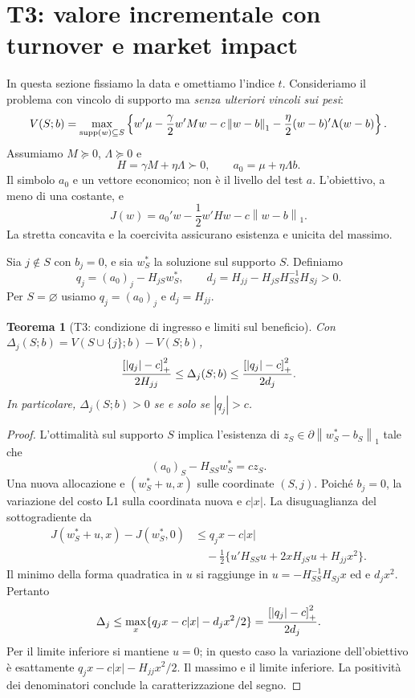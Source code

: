 \documentclass[11pt,a4paper]{article}
\newtheorem{theorem}{Teorema}[section]
\theoremstyle{definition}\newtheorem{definition}[theorem]{Definizione}
\theoremstyle{remark}\newtheorem{remark}[theorem]{Osservazione}
\newcommand{\norm}[1]{\left\lVert#1\right\rVert}\newcommand{\abs}[1]{\left|#1\right|}
\begin{document}
\section{T3: valore incrementale con turnover e market impact}
\label{sec:T3}
In questa sezione fissiamo la data e omettiamo l'indice $t$. Consideriamo il problema con vincolo di supporto ma \emph{senza ulteriori vincoli sui pesi}:
\begin{equation}
 V(S;b)=\max_{\supp(w)\subseteq S}\left\{w'\mu-\frac\gamma2w'Mw
 -c\norm{w-b}_1-\frac\eta2(w-b)'\Lambda(w-b)\right\}.
\end{equation}
Assumiamo $M\succeq0$, $\Lambda\succeq0$ e
\begin{equation}
 H=\gamma M+\eta\Lambda\succ0,\qquad a_0=\mu+\eta\Lambda b.
\end{equation}
Il simbolo $a_0$ e un vettore economico; non è il livello del test $a$. L'obiettivo, a meno di una costante, e
\begin{equation}
 J(w)=a_0'w-\frac12w'Hw-c\norm{w-b}_1.
\end{equation}
La stretta concavita e la coercivita assicurano esistenza e unicita del massimo.

Sia $j\notin S$ con $b_j=0$, e sia $w_S^*$ la soluzione sul supporto $S$. Definiamo
\begin{equation}
 q_j=(a_0)_j-H_{jS}w_S^*,\qquad
 d_j=H_{jj}-H_{jS}H_{SS}^{-1}H_{Sj}>0.
\end{equation}
Per $S=\varnothing$ usiamo $q_j=(a_0)_j$ e $d_j=H_{jj}$.

\begin{theorem}[T3: condizione di ingresso e limiti sul beneficio]
Con $\Delta_j(S;b)=V(S\cup\{j\};b)-V(S;b)$,
\begin{equation}
 \frac{\left[|q_j|-c\right]_+^2}{2H_{jj}}
 \le\Delta_j(S;b)\le
 \frac{\left[|q_j|-c\right]_+^2}{2d_j}.\label{eq:T3}
\end{equation}
In particolare, $\Delta_j(S;b)>0$ se e solo se $|q_j|>c$.
\end{theorem}
\begin{proof}
L'ottimalità sul supporto $S$ implica l'esistenza di $z_S\in\partial\norm{w_S^*-b_S}_1$ tale che
\begin{equation}
 (a_0)_S-H_{SS}w_S^*=cz_S.
\end{equation}
Una nuova allocazione e $(w_S^*+u,x)$ sulle coordinate $(S,j)$. Poiché $b_j=0$, la variazione del costo L1 sulla coordinata nuova e $c|x|$. La disuguaglianza del sottogradiente da
\begin{align*}
 J(w_S^*+u,x)-J(w_S^*,0)
 &\le q_jx-c|x|\\
 &\quad-\frac12\{u'H_{SS}u+2xH_{jS}u+H_{jj}x^2\}.
\end{align*}
Il minimo della forma quadratica in $u$ si raggiunge in $u=-H_{SS}^{-1}H_{Sj}x$ ed e $d_jx^2$. Pertanto
\begin{equation}
 \Delta_j\le\max_x\{q_jx-c|x|-d_jx^2/2\}
 =\frac{\left[|q_j|-c\right]_+^2}{2d_j}.
\end{equation}
Per il limite inferiore si mantiene $u=0$; in questo caso la variazione dell'obiettivo è esattamente $q_jx-c|x|-H_{jj}x^2/2$. Il massimo e il limite inferiore. La positività dei denominatori conclude la caratterizzazione del segno.
\end{proof}
\end{document}
